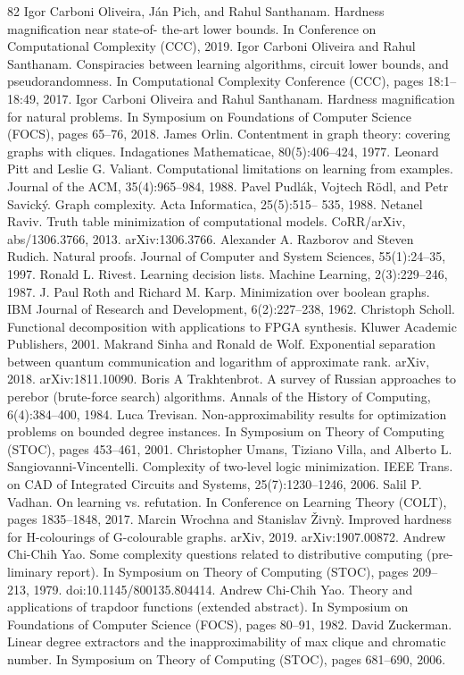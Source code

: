 \documentclass[10pt,a4paper]{article}
\begin{document}
\begin{thebibliography}{82}
Igor Carboni Oliveira, Ján Pich, and Rahul Santhanam. Hardness magnification near state-of- the-art lower bounds. In Conference on Computational Complexity (CCC), 2019.
Igor Carboni Oliveira and Rahul Santhanam. Conspiracies between learning algorithms, circuit lower bounds, and pseudorandomness. In Computational Complexity Conference (CCC), pages 18:1–18:49, 2017.
Igor Carboni Oliveira and Rahul Santhanam. Hardness magnification for natural problems. In Symposium on Foundations of Computer Science (FOCS), pages 65–76, 2018.
James Orlin. Contentment in graph theory: covering graphs with cliques. Indagationes Mathematicae, 80(5):406–424, 1977.
Leonard Pitt and Leslie G. Valiant. Computational limitations on learning from examples. Journal of the ACM, 35(4):965–984, 1988.
Pavel Pudlák, Vojtech Rödl, and Petr Savický. Graph complexity. Acta Informatica, 25(5):515– 535, 1988.
Netanel Raviv.     Truth table minimization of computational models.           CoRR/arXiv, abs/1306.3766, 2013. arXiv:1306.3766.
Alexander A. Razborov and Steven Rudich. Natural proofs. Journal of Computer and System Sciences, 55(1):24–35, 1997.
Ronald L. Rivest. Learning decision lists. Machine Learning, 2(3):229–246, 1987.
J. Paul Roth and Richard M. Karp. Minimization over boolean graphs. IBM Journal of Research and Development, 6(2):227–238, 1962.
Christoph Scholl. Functional decomposition with applications to FPGA synthesis. Kluwer Academic Publishers, 2001.
Makrand Sinha and Ronald de Wolf. Exponential separation between quantum communication and logarithm of approximate rank. arXiv, 2018. arXiv:1811.10090.
Boris A Trakhtenbrot. A survey of Russian approaches to perebor (brute-force search) algorithms. Annals of the History of Computing, 6(4):384–400, 1984.
Luca Trevisan. Non-approximability results for optimization problems on bounded degree instances. In Symposium on Theory of Computing (STOC), pages 453–461, 2001.
Christopher Umans, Tiziano Villa, and Alberto L. Sangiovanni-Vincentelli. Complexity of two-level logic minimization. IEEE Trans. on CAD of Integrated Circuits and Systems, 25(7):1230–1246, 2006.
Salil P. Vadhan. On learning vs. refutation. In Conference on Learning Theory (COLT), pages 1835–1848, 2017.
Marcin Wrochna and Stanislav Živnỳ. Improved hardness for H-colourings of G-colourable graphs. arXiv, 2019. arXiv:1907.00872.
Andrew Chi-Chih Yao. Some complexity questions related to distributive computing (pre- liminary report). In Symposium on Theory of Computing (STOC), pages 209–213, 1979. doi:10.1145/800135.804414.
Andrew Chi-Chih Yao. Theory and applications of trapdoor functions (extended abstract). In Symposium on Foundations of Computer Science (FOCS), pages 80–91, 1982.
David Zuckerman. Linear degree extractors and the inapproximability of max clique and chromatic number. In Symposium on Theory of Computing (STOC), pages 681–690, 2006.
\end{thebibliography}
\end{document}
